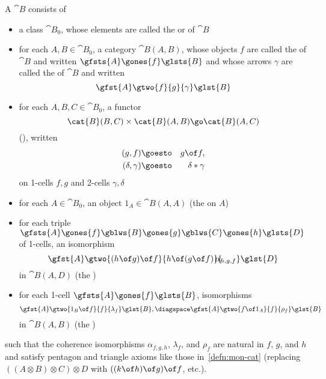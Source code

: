 \begin{defn}	
A %
%
%
$\cat{B}$ consists of
%
\begin{itemize}
\item a class $\cat{B}_0$, whose elements are called the  or
%
%
%
of $\cat{B}$
\item for each $A, B \in \cat{B}_0$, a category $\cat{B}(A, B)$, whose
  objects $f$ are called the  of $\cat{B}$ and written 
  $
  \gfsts{A} \gones{f} \glsts{B}
  $
  and whose arrows $\gamma$ are called the  of $\cat{B}$ and
  written 
  \[
  \gfst{A} \gtwo{f}{g}{\gamma} \glst{B}
  \]
\item for each $A, B, C \in \cat{B}_0$, a functor
%
\[
\cat{B}(B, C) \times \cat{B}(A, B) \go \cat{B}(A, C)
\]
(), written 
%
\begin{eqnarray*}
(g, f)			&\goesto	&g \of f,	\\
(\delta, \gamma)	&\goesto	&\delta * \gamma	
\end{eqnarray*}%
% 
%
% 
on 1-cells $f, g$ and 2-cells $\gamma, \delta$
\item for each $A \in \cat{B}_0$, an object $1_A \in \cat{B}(A, A)$ (the
   on $A$)
\item for each triple 
  $
  \gfsts{A}\gones{f}\gblws{B}\gones{g}\gblws{C}\gones{h}\glsts{D}
  $
  of 1-cells, an isomorphism
  \[
  \gfst{A}
  \gtwo{(h\of g) \of f}{h \of (g\of f)}{\!\!\!\!\!\alpha_{h, g, f}}
  \glst{D}
  \]%
% 
%
% 
in $\cat{B}(A, D)$ (the )%
%
%
%
%
\item for each 1-cell $\gfsts{A}\gones{f}\glsts{B}$, isomorphisms
  \[
  \gfst{A}
  \gtwo{1_B \of f}{f}{\lambda_f}
  \glst{B},
  \diagspace
  \gfst{A}
  \gtwo{f \of 1_A}{f}{\rho_f}
  \glst{B}
  \]%
% 
%
% 
in $\cat{B}(A, B)$ (the )%
%
%
\end{itemize}
%
such that the coherence isomorphisms $\alpha_{f, g, h}$, $\lambda_f$, and
$\rho_f$ are natural in $f$, $g$, and $h$ and satisfy pentagon and triangle
axioms like those in~\ref{defn:mon-cat} (replacing $((A\otimes B) \otimes
C) \otimes D$ with $((k\of h) \of g) \of f$, etc.).
\end{defn}

